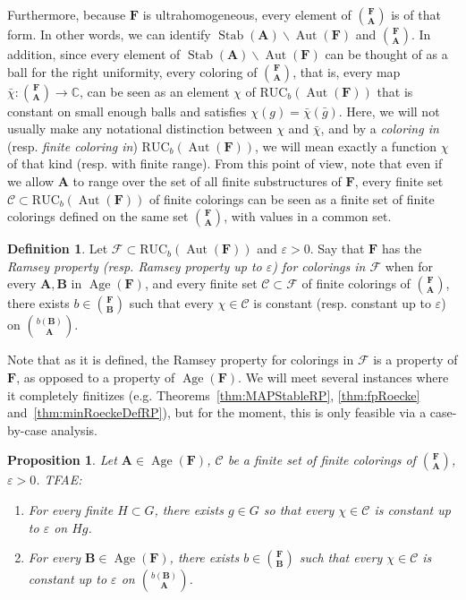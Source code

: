 \documentclass[11pt]{article}
\newtheorem{prop}[theo]{Proposition}
\theoremstyle{definition}
\newtheorem{defi}[theo]{Definition}
\numberwithin{equation}{section}
\numberwithin{figure}{section}
\numberwithin{table}{section}
\newcommand{\CC}{\mathbb{C}}
\newcommand*{\mA}{\mathbf{A}}
\newcommand*{\mB}{\mathbf{B}}
\newcommand*{\mF}{\mathbf{F}}
\newcommand{\e}{\varepsilon}
\DeclareMathOperator{\Aut}{Aut}
\DeclareMathOperator{\Stab}{Stab}
\DeclareMathOperator{\Age}{Age}
\newcommand{\RUCB}{\mathrm{RUC}_{b}}
\begin{document}
Furthermore, because $\mF$ is ultrahomogeneous, every element of $\binom{\mF}{\mA}$ is of that form. In other words, we can identify $\Stab(\mA)\backslash \Aut(\mF)$ and $\binom{\mF}{\mA}$. In addition, since every element of $\Stab(\mA)\backslash \Aut(\mF)$ can be thought of as a ball for the right uniformity, every coloring of $\binom{\mF}{\mA}$, that is, every map $\bar\chi:\binom{\mF}{\mA}\rightarrow \CC$, can be seen as an element $\chi$ of $\RUCB(\Aut(\mF))$ that is constant on small enough balls and satisfies $\chi(g)=\bar\chi(\bar g)$. Here, we will not usually make any notational distinction between $\chi$ and $\bar\chi$, and by a \emph{coloring in} (resp. \emph{finite coloring in}) $\RUCB(\Aut(\mF))$, we will mean exactly a function $\chi$ of that kind (resp. with finite range). From this point of view, note that even if we allow $\mA$ to range over the set of all finite substructures of $\mF$, every finite set $\mathcal C \subset \RUCB(\Aut(\mF))$ of finite colorings can be seen as a finite set of finite colorings defined on the same set $\binom{\mF}{\mA}$, with values in a common set.

\begin{defi}
Let $\mathcal F \subset \RUCB(\Aut(\mF))$ and $\e>0$. Say that $\mF$ has the \emph{Ramsey property (resp. Ramsey property up to $\e$) for colorings in $\mathcal F$} when for every $\mA, \mB$ in $\Age(\mF)$, and every finite set $\mathcal C \subset \mathcal F$ of finite colorings of $\binom{\mF}{\mA}$, there exists $b\in \binom{\mF}{\mB}$ such that every $\chi\in \mathcal C$ is constant (resp. constant up to $\e$) on $\binom{b(\mB)}{\mA}$.
\end{defi}

Note that as it is defined, the Ramsey property for colorings in $\mathcal F$ is a property of $\mF$, as opposed to a property of $\Age(\mF)$. We will meet several instances where it completely finitizes (e.g. Theorems~\ref{thm:MAPStableRP}, \ref{thm:fpRoecke} and~\ref{thm:minRoeckeDefRP}), but for the moment, this is only feasible via a case-by-case analysis.



\begin{prop}\label{prop:aOSRamsey}
Let $\mA \in \Age(\mF)$, $\mathcal C$ be a finite set of finite colorings of $\binom{\mF}{\mA}$, $\e>0$. TFAE:
\begin{enumerate}
\item For every finite $H\subset G$, there exists $g\in G$ so that every $\chi \in \mathcal C$ is constant up to $\varepsilon$ on $Hg$.

\item For every $\mB \in \Age(\mF)$, there exists $b\in \binom{\mF}{\mB}$ such that every $\chi\in \mathcal C$ is constant up to $\e$ on $\binom{b(\mB)}{\mA}$.
\end{enumerate}
\end{prop}
\end{document}
